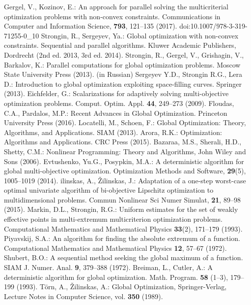 \documentclass{svproc}
\providecommand{\doi}[1]{doi:\discretionary{}{}{}#1}
\begin{document}
\begin{thebibliography}{6}
Gergel, V., Kozinov, E.: An approach for parallel solving the multicriterial optimization problems with non-convex constraints. Communications in Computer and Information Science, \textbf{793}, 121--135 (2017). \doi{10.1007/978-3-319-71255-0\_10}
Strongin, R., Sergeyev, Ya.: Global optimization with non-convex constraints. Sequential and parallel algorithms. Kluwer Academic Publishers, Dordrecht (2nd ed. 2013, 3rd ed. 2014).
Strongin, R., Gergel, V., Grishagin, V., Barkalov, K.: Parallel computations for global optimization problems. Moscow State University Press (2013). (in Russian)
Sergeyev Y.D., Strongin R.G., Lera D.: Introduction to global optimization exploiting space-filling curves. Springer (2013).
Eichfelder, G.: Scalarizations for adaptively solving multi-objective optimization problems. Comput. Optim. Appl. \textbf{44}, 249--273 (2009). 
Floudas, C.A., Pardalos, M.P.: Recent Advances in Global Optimization. Princeton University Press (2016).
Locatelli, M., Schoen, F.: Global Optimization: Theory, Algorithms, and Applications. SIAM (2013).
Arora, R.K.: Optimization: Algorithms and Applications. CRC Press (2015).
Bazaraa, M.S., Sherali, H.D., Shetty, C.M.: Nonlinear Programming: Theory and Algorithms, John Wiley and Sons (2006).
Evtushenko, Yu.G., Posypkin, M.A.: A deterministic algorithm for global multi-objective optimization. Optimization Methods and Software, \textbf{29}(5), 1005--1019 (2014).
ilinskas, A., {\v Z}ilinskas, J.: Adaptation of a one-step worst-case optimal univariate algorithm of bi-objective Lipschitz optimization to multidimensional problems. Commun Nonlinear Sci Numer Simulat, \textbf{21}, 89--98 (2015).
Markin, D.L., Strongin, R.G.: Uniform estimates for the set of weakly effective points in multi-extremum multicriterion optimization problems. Computational Mathematics and Mathematical Physics \textbf{33}(2), 171--179 (1993).
Piyavskij, S.A.: An algorithm for finding the absolute extremum of a function. Computational Mathematics and Mathematical Physics \textbf{12}, 57--67 (1972).
Shubert, B.O.: A sequential method seeking the global maximum of a function. SIAM J. Numer. Anal. \textbf{9}, 379--388 (1972).
Breiman, L., Cutler, A.: A deterministic algorithm for global optimization. Math. Program. \textbf{58} (1--3), 179--199 (1993). 
T\"{o}rn, A., {\v Z}ilinskas, A.: Global Optimization, Springer-Verlag, Lecture Notes in Computer Science, vol. \textbf{350} (1989).

\end{thebibliography}
\end{document}

